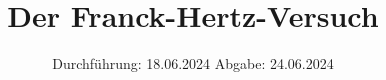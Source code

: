 

\subject{v601}
\title{Der Franck-Hertz-Versuch}
\date{%
  Durchführung: 18.06.2024
  \hspace{3em}
  Abgabe: 24.06.2024
}



\maketitle
\thispagestyle{empty}
\tableofcontents
\newpage






\printbibliography{}

